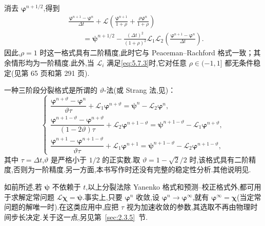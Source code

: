 消去 \(\boldsymbol{\varphi}^{n+1/2}\),得到
\begin{equation}\label{eq:5.7.10}
  \begin{aligned}
    &\frac{\boldsymbol{\varphi}^{n+1}-\boldsymbol{\varphi}^n}{\Delta t}
      +\mathcal L\left(\frac{\boldsymbol{\varphi}^{n+1}}{1+\rho}
                   +\frac{\rho\boldsymbol{\varphi}^n}{1+\rho}\right)\\
    &\qquad=\boldsymbol{\psi}^{n+1/2}
      -\frac{(\Delta t)^2}{(1+\rho)^2}\mathcal L_1\mathcal L_2
       \left(\frac{\boldsymbol{\varphi}^{n+1}-\boldsymbol{\varphi}^n}{\Delta t}\right).
  \end{aligned}
\end{equation}
因此,\(\rho=1\) 时这一格式具有二阶精度,此时它与 Peaceman--Rachford 格式一致；其余情形均为一阶精度.此外,当 \(\mathcal L_i\) 满足\eqref{eq:5.7.3}时,它对任意 \(\rho\in(-1,1]\) 都无条件稳定(见第 65 页和第 291 页).

一种三阶段分裂格式是所谓的 \(\vartheta\)-法(或 Strang 法,见)：
\begin{equation}\label{eq:5.7.11}
  \begin{cases}
    \dfrac{\boldsymbol{\varphi}^{n+\vartheta}-\boldsymbol{\varphi}^n}{\vartheta\tau}
      +\mathcal L_1\boldsymbol{\varphi}^{n+\vartheta}=\boldsymbol{\psi}^n-\mathcal L_2\boldsymbol{\varphi}^n,\\[4pt]
    \dfrac{\boldsymbol{\varphi}^{n+1-\vartheta}-\boldsymbol{\varphi}^{n+\vartheta}}{(1-2\vartheta)\tau}
      +\mathcal L_2\boldsymbol{\varphi}^{n+1-\vartheta}
       =\boldsymbol{\psi}^{n+1-\vartheta}-\mathcal L_1\boldsymbol{\varphi}^{n+\vartheta},\\[4pt]
    \dfrac{\boldsymbol{\varphi}^{n+1}-\boldsymbol{\varphi}^{n+1-\vartheta}}{\vartheta\tau}
      +\mathcal L_1\boldsymbol{\varphi}^{n+1}
       =\boldsymbol{\psi}^{n+1-\vartheta}-\mathcal L_2\boldsymbol{\varphi}^{n+1-\vartheta},
  \end{cases}
\end{equation}
其中 \(\tau=\Delta t\),\(\vartheta\) 是严格小于 \(1/2\) 的正实数.取 \(\vartheta=1-\sqrt2/2\) 时,该格式具有二阶精度,否则为一阶精度.另一方面,本书写作时还没有完整的稳定性分析.其他说明见.

如前所述,若 \(\boldsymbol{\psi}\) 不依赖于 \(t\),以上分裂法除 Yanenko 格式和预测--校正格式外,都可用于求解定常问题 \(\mathcal L\boldsymbol{\chi}=\boldsymbol{\psi}\).事实上,只要 \(\boldsymbol{\varphi}^n\) 收敛,设 \(\boldsymbol{\varphi}^n\to\boldsymbol{\varphi}^\infty\),就有 \(\boldsymbol{\varphi}^\infty=\boldsymbol{\chi}\)(当定常问题的解唯一时).在这类应用中,应把 \(\tau\) 视为加速收敛的参数,其选取不再由物理时间步长决定.关于这一点,另见第~\ref{sec:2.3.5}~节.

